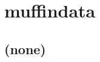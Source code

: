 
\cleardoublepage


\chapter{muffindata}\label{ch:muffindata}

\hfill \break

\newpage

\section{(none)}

